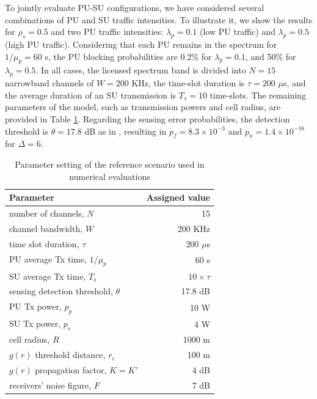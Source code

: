 To jointly evaluate PU-SU configurations, we have considered several combinations of PU and SU traffic intensities. To illustrate it, we show the results for $\rho_{s}=0.5$ and two PU traffic intensities: $\lambda_{p}=0.1$ (low PU traffic) and $\lambda_{p}=0.5$ (high PU traffic). Considering that each PU remains in the spectrum for $1/\mu_{p}=60$ s, the PU blocking probabilities are 0.2\% for $\lambda_{p}=0.1$, and 50\% for $\lambda_{p}=0.5$.  
In all cases, the licensed spectrum band is divided into $N=15$ narrowband channels of $W=200$ KHz, the time-slot duration is $\tau=200$ $\mu$s, and the average duration of an SU transmission is $T_{s}=10$ time-slots. The remaining parameters of the model, such as transmission powers and cell radius, are provided in Table \ref{BR_table_sim_param}. 
Regarding the sensing error probabilities, the detection threshold is $\theta=17.8$ dB as in \cite{ref:comparativaMAC}, resulting in $p_{f}=8.3\times10^{-3}$ and $p_{n}=1.4\times10^{-16}$ for $\Delta=6$.

\begin{table}
\begin{tabular}{lr} \hline
\textbf{Parameter} & \textbf{Assigned value}\\\hline
number of channels, $N$&15\\
channel bandwidth, $W$&200 KHz\\
time slot duration, $\tau$&200 $\mu$s\\
PU average Tx time, $1/\mu_{p}$&60 s\\
SU average Tx time, $T_{s}$&$10\times\tau$\\
sensing detection threshold, $\theta$&17.8 dB\\
PU Tx power, $p_{p}$&10 W\\
SU Tx power, $p_{s}$&4 W\\
cell radius, $R$ &1000 m\\
$g(r)$ threshold distance, $r_{c}$&100 m\\
$g(r)$ propagation factor, $K=K'$&4 dB\\
receivers' noise figure, $F$&7 dB\\\hline
\end{tabular}
\centering
\caption{Parameter setting of the reference scenario used in numerical evaluations}
\label{BR_table_sim_param}
\end{table}

